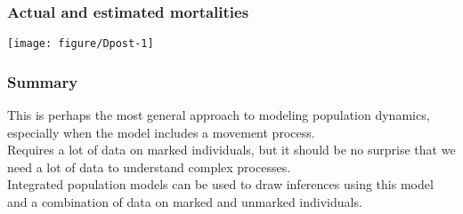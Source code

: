 \documentclass[color=usenames,dvipsnames]{beamer}\usepackage[]{graphicx}\usepackage[]{color}
\begin{document}
\begin{frame}
  \frametitle{Actual and estimated mortalities}
  \begin{center}
    \texttt{[image: figure/Dpost-1]}
  \end{center}
\end{frame}








\begin{frame}
  \frametitle{Summary}
  This is perhaps the most general approach to modeling population
  dynamics, especially when the model includes a movement process. \\
  \pause \vfill
  Requires a lot of data on marked individuals, but it should be no
  surprise that we need a lot of data to understand complex
  processes. \\ 
  \pause \vfill
  Integrated population models can be used to draw inferences using
  this model and a combination of data on marked and unmarked
  individuals. \\ 
\end{frame}
\end{document}
